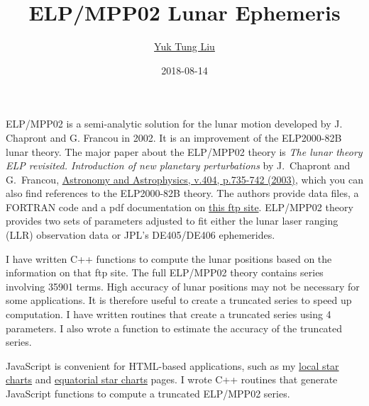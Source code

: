 \documentclass[12pt]{article}
\begin{document}
\title{ELP/MPP02 Lunar Ephemeris}
\author{\href{https://publish.illinois.edu/ytliu/}{Yuk Tung Liu}}
\date{2018-08-14}
\maketitle


ELP/MPP02 is a semi-analytic solution for the lunar motion developed by 
J. Chapront and G. Francou in 2002. It is an improvement of the ELP2000-82B 
lunar theory. The major paper about the ELP/MPP02 theory is 
{\it The lunar theory ELP revisited. 
Introduction of new planetary perturbations} by J.\ Chapront and G.\ Francou, 
\href{https://ui.adsabs.harvard.edu/abs/2003A%26A...404..735C/abstract}{Astronomy and Astrophysics, 
v.404, p.735-742 (2003)}, which you can also find references to the ELP2000-82B 
theory. The authors provide data files, a FORTRAN code and a 
pdf documentation on \href{ftp://cyrano-se.obspm.fr/pub/2_lunar_solutions/2_elpmpp02/}{this 
ftp site}. ELP/MPP02 theory provides two sets of parameters adjusted to fit 
either the lunar laser ranging (LLR) observation data or JPL's DE405/DE406 
ephemerides.

I have written C++ functions to compute the lunar positions based on  
the information on that ftp site. The full ELP/MPP02 theory contains 
series involving 35901 terms. High accuracy of lunar positions 
may not be necessary for some applications. It is therefore useful to create 
a truncated series to speed up computation. I have written routines 
that create a truncated series using 4 parameters. I 
also wrote a function to estimate the accuracy of the truncated series. 

JavaScript is convenient for HTML-based applications, such as my
\href{https://ytliu0.github.io/starCharts/}{local star charts} and
\href{https://ytliu0.github.io/starCharts/chartGCRS_min.html}{equatorial star
charts} pages. I wrote C++ routines that generate JavaScript functions to compute a truncated ELP/MPP02 series.
\end{document}
